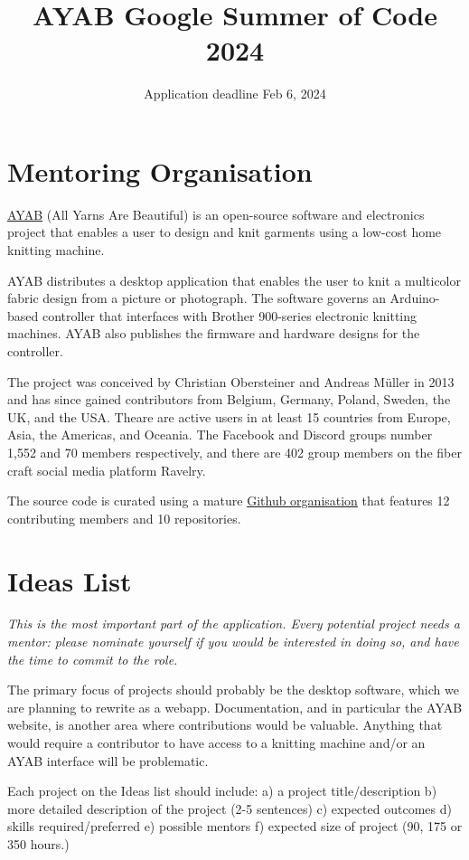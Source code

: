 \documentclass{article}
\title{AYAB Google Summer of Code 2024}
\author{Application deadline Feb 6, 2024}
\begin{document}
\maketitle

\section{Mentoring Organisation}

\href{https://ayab-knitting.com/}{AYAB} (All Yarns Are Beautiful) is an open-source software and electronics project that enables a user to design and knit garments using a low-cost home knitting machine. 

AYAB distributes a desktop application that enables the user to knit a multicolor fabric design from a picture or photograph. The software governs an Arduino-based controller that interfaces with Brother 900-series electronic knitting machines. AYAB also publishes the firmware and hardware designs for the controller.

The project was conceived by Christian Obersteiner and Andreas M{\"u}ller in 2013 and has since gained contributors from Belgium, Germany, Poland, Sweden, the UK, and the USA. Theare are active users in at least 15 countries from Europe, Asia, the Americas, and Oceania. The Facebook and Discord groups number 1,552 and 70 members respectively, and there are 402 group members on the fiber craft social media platform Ravelry.

The source code is curated using a mature \href{https://github.com/AllYarnsAreBeautiful}{Github organisation} that features 12 contributing members and 10 repositories.

\section{Ideas List}

{\itshape
This is the most important part of the application. Every potential project needs a mentor: please nominate yourself if you would be interested in doing so, and have the time to commit to the role.

The primary focus of projects should probably be the desktop software, which we are planning to rewrite as a webapp. Documentation, and in particular the AYAB website, is another area where contributions would be valuable. Anything that would require a contributor to have access to a knitting machine and/or an AYAB interface will be problematic.

Each project on the Ideas list should include: a) a project title/description b) more detailed description of the project (2-5 sentences) c) expected outcomes d) skills required/preferred e) possible mentors f) expected size of project (90, 175 or 350 hours.)
}
\end{document}
